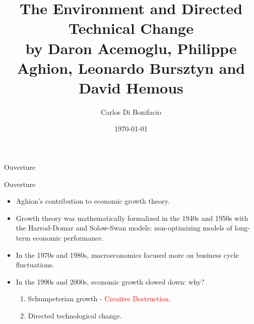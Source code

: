 \documentclass[aspectratio=169,xcolor=dvipsnames]{beamer}
\title{The Environment and Directed Technical Change
 \\ \small by Daron Acemoglu, Philippe Aghion, Leonardo Bursztyn  and David Hemous}
\subtitle{}
\author{Carlos Di Bonifacio}
\institute
{
   ENSAE %
}
\date{\today} %
\begin{document}
\begin{frame}
    \titlepage
\end{frame}



\begin{frame}
    \tableofcontents
\end{frame}

\begin{frame}{}
\centering
\Large Ouverture
\end{frame}

\begin{frame}{Ouverture}
    \begin{itemize}
\item Aghion's contribution to economic growth theory.
\item Growth theory was mathematically formalized in the 1940s and 1950s with the Harrod-Domar and Solow-Swan models: non-optimizing models of long-term economic performance. 
\item In the 1970s and 1980s, macroeconomics focused more on business cycle fluctuations.
\item In the 1990s and 2000s, economic growth slowed down: why? 
        \begin{enumerate}
\item Schumpeterian growth - \textcolor{red}{Creative Destruction}. 
\item Directed technological change. 
        \end{enumerate}
    \end{itemize}
\end{frame}
\end{document}
